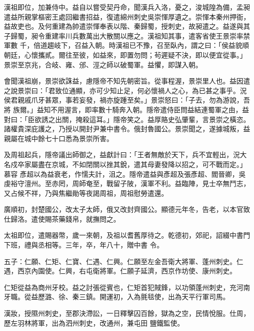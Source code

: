 \begin{pinyinscope}
 漢祖即位，加兼侍中。益自以嘗受契丹命，聞漢兵入洛，憂之，浚城隍為備，孟昶遣益所親掌樞密王處回繼書招益，復遣綿州刺史吳崇惲厚遺之。崇惲本秦州押衙，益故吏也。及何重建為帥遣崇惲奉表以階、秦歸蜀，授刺史，故昶遣之。益遂與其子歸蜀，昶令重建率川兵數萬出大散關以應之。漢祖知其事，遣客省使王景崇率禁軍數
 千，倍道趨岐下，召益入朝。時漢祖已不豫，召至臥內，謂之曰：「侯益貌順朝廷，心懷攜貳。爾往至彼，如益來，即置勿問；茍遲疑不決，即以便宜從事。」景崇至京兆，合岐、雍、邠、涇之師以破蜀軍。益懼，即謀入朝。



 會聞漢祖崩，景崇欲誅益，慮隱帝不知先朝密旨。從事程渥，景崇里人也。益因遣之說景崇曰：「君致位通顯，亦可少知止足，何必懷禍人之心，為已甚之事乎。況侯君親戚爪牙甚眾，事若妄發，禍亦旋踵至矣。」景崇怒曰：「子去，勿為游說，吾將
 族爾。」益知不用渥言，即率數十騎奔入朝。隱帝遣侍臣問益結連蜀軍之由，益對曰：「臣欲誘之出關，掩殺這耳。」隱帝笑之。益厚賂史弘肇輩，言景崇之橫恣。諸權貴深庇護之，乃授以開封尹兼中書令。俄封魯國公。景崇聞之，遂據城叛，益親屬在城中餘七十口悉為景崇所害。



 及周祖起兵，隱帝議出師御之，益獻計曰：「王者無敵於天下，兵不宜輕出，況大名戍卒家屬盡在京城，不如閉關以挫其銳，遣其母妻發降以招之，可不戰而定。」慕容
 彥超以為益衰老，作懦夫計，沮之。隱帝遣益與彥超及張彥超、閻晉卿，吳虔裕守澶州。至赤罔，周師奄至，戰留子陂，漢軍不利。益臨陣，見士卒無鬥志，又占候不祥，乃與焦繼勛等夜謁周祖，周祖慰勞遣還。



 廣順初，封楚國公，改太子太師，俄又改封齊國公。顯德元年冬，告老，以本官致仕歸洛。遣使賜茶藥錢帛，就撫問之。



 太祖即位，遣賜器幣，歲一來朝，及祖以耆舊厚待之。乾德初，郊祀，詔綴中書門下班，禮與丞相等。三年，卒，年八十，贈中書
 令。



 五子：仁願、仁矩、仁寶、仁遇、仁興。仁願至左金吾衛大將軍、蓬州刺史。仁遇，西京內園使。仁興，右屯衛將軍。仁願子延濟，西京作坊使、康州刺史。



 仁矩從益為商州牙校。益之討張從賓也，仁矩首犯賊鋒，以功領蓬州刺史，充河南牙職。從益歷潞、徐、秦三鎮。開運初，入為氈毯使，出為天平行軍司馬。



 漢妝，授隰州刺史，至郡決滯訟，一日釋擊囚百餘，獄為之空，民情悅服。仕周，歷左羽林將軍，出為泗州刺史，改通州，兼屯田
 鹽鐵監使。




\end{pinyinscope}
